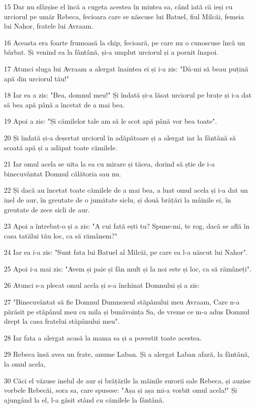 \par 15 Dar nu sfârșise el încă a cugeta acestea în mintea sa, când iată că ieși cu urciorul pe umăr Rebeca, fecioara care se născuse lui Batuel, fiul Milcăi, femeia lui Nahor, fratele lui Avraam.
\par 16 Aceasta era foarte frumoasă la chip, fecioară, pe care nu o cunoscuse încă un bărbat. Și venind ea la fântână, și-a umplut urciorul și a pornit înapoi.
\par 17 Atunci sluga lui Avraam a alergat înaintea ei și i-a zis: "Dă-mi să beau puțină apă din urciorul tău!"
\par 18 Iar ea a zis: "Bea, domnul meu!" Și îndată și-a lăsat urciorul pe brațe și i-a dat să bea apă până a încetat de a mai bea.
\par 19 Apoi a zis: "Și cămilelor tale am să le scot apă până vor bea toate".
\par 20 Și îndată și-a deșertat urciorul în adăpătoare și a alergat iar la fântână să scoată apă și a adăpat toate cămilele.
\par 21 Iar omul acela se uita la ea cu mirare și tăcea, dorind să știe de i-a binecuvântat Domnul călătoria sau nu.
\par 22 Și dacă au încetat toate cămilele de a mai bea, a luat omul acela și i-a dat un inel de aur, în greutate de o jumătate siclu, și două brățări la mâinile ei, în greutate de zece sicli de aur.
\par 23 Apoi a întrebat-o și a zis: "A cui fată ești tu? Spune-mi, te rog, dacă se află în casa tatălui tău loc, ca să rămânem?"
\par 24 Iar ea i-a zis: "Sunt fata lui Batuel al Milcăi, pe care ea l-a născut lui Nahor".
\par 25 Apoi i-a mai zis: "Avem și paie și fân mult și la noi este și loc, ca să rămâneți".
\par 26 Atunci s-a plecat omul acela și s-a închinat Domnului și a zis:
\par 27 "Binecuvântat să fie Domnul Dumnezeul stăpânului meu Avraam, Care n-a părăsit pe stăpânul meu cu mila și bunăvoința Sa, de vreme ce m-a adus Domnul drept la casa fratelui stăpânului meu".
\par 28 Iar fata a alergat acasă la mama sa și a povestit toate acestea.
\par 29 Rebeca însă avea un frate, anume Laban. Și a alergat Laban afară, la fântână, la omul acela,
\par 30 Căci el văzuse inelul de aur și brățările la mâinile surorii sale Rebeca, și auzise vorbele Rebecăi, sora sa, care spusese: "Așa și așa mi-a vorbit omul acela!" Și ajungând la el, l-a găsit stând cu cămilele la fântână.
